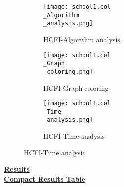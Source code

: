 \documentclass[10pt]{article}
\begin{document}
\graphicspath{{./Core1/Solutions/HCFI/school1.col}}
\begin{figure}[H]
\begin{subfigure}{.33\textwidth}
  \centering
  \texttt{[image: school1.col\\\_Algorithm\\\_analysis.png]}
  \caption{HCFI-Algorithm analysis}
   \label{fig:subfig1}
\end{subfigure}%
\begin{subfigure}{.33\textwidth}
  \centering
  \texttt{[image: school1.col\\\_Graph\\\_coloring.png]}
  \caption{HCFI-Graph coloring}
  \label{fig:subfig2}
\end{subfigure}
\begin{subfigure}{.33\textwidth}
  \centering
  \texttt{[image: school1.col\\\_Time\\\_analysis.png]}
  \caption{HCFI-Time analysis}
  \end{subfigure}
\end{figure}
\vspace{2cm}
\begin{center}
\hyperlink{page.8}{\textbf{Results}}\\
\vspace{0.5cm}
\hyperlink{page.71}{\textbf{Compact Results Table}}
\end{center}
\pagebreak
\end{document}
